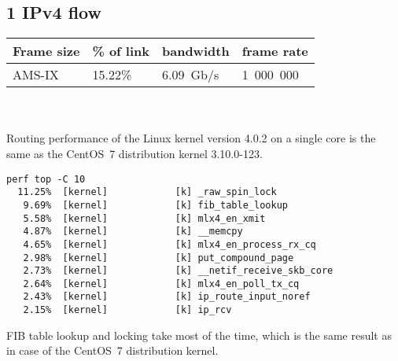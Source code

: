 
\subsection{1 IPv4 flow}
\begin{tabular}{ | l | l | l | l | }
\hline
Frame size & \% of link & bandwidth & frame rate \\
\hline
AMS-IX & 15.22\% &  6.09~Gb/s & 1~000~000 \\
\hline
\end{tabular}
\\
\\
Routing performance of the Linux kernel version 4.0.2 on a single core is the same as the CentOS~7 distribution kernel 3.10.0-123.


\begin{lstlisting}
perf top -C 10
  11.25%  [kernel]            [k] _raw_spin_lock
   9.69%  [kernel]            [k] fib_table_lookup
   5.58%  [kernel]            [k] mlx4_en_xmit
   4.87%  [kernel]            [k] __memcpy
   4.65%  [kernel]            [k] mlx4_en_process_rx_cq
   2.98%  [kernel]            [k] put_compound_page
   2.73%  [kernel]            [k] __netif_receive_skb_core
   2.64%  [kernel]            [k] mlx4_en_poll_tx_cq
   2.43%  [kernel]            [k] ip_route_input_noref
   2.15%  [kernel]            [k] ip_rcv

\end{lstlisting}
FIB table lookup and locking take most of the time,
which is the same result as in case of the CentOS~7 distribution kernel.
